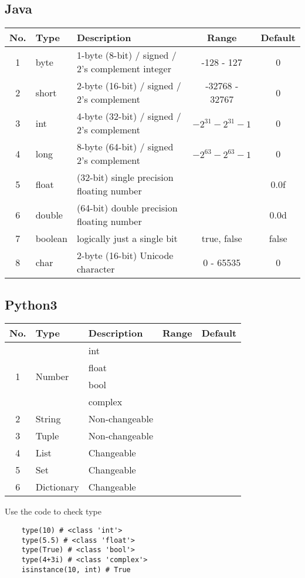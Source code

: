 \documentclass[12pt, a4pape]{article}
\begin{document}
	\subsection{Java}
	\begin{table}[H]
	\centering
	\begin{tabular}{c|l|l|c|c}
	\toprule
	No. & Type & Description & Range & Default \\
	\toprule
	1 & byte & 1-byte (8-bit) / signed / 2's complement integer & -128 - 127 & 0 \\
	\hline
	2 & short & 2-byte (16-bit) / signed / 2's complement & -32768 - 32767 & 0 \\
	\hline
	3 & int & 4-byte (32-bit) / signed / 2's complement & $-2^{31} - 2^{31}-1$ & 0 \\
	\hline
	4 & long & 8-byte (64-bit) / signed 2's complement & $-2^{63} - 2^{63}-1$ & 0 \\
	\hline
	5 & float & (32-bit) single precision floating number  & & 0.0f \\
	\hline
	6 & double & (64-bit) double precision floating number & & 0.0d \\
	\hline
	7 & boolean & logically just a single bit &  true, false & false \\
	\hline
	8 & char & 2-byte (16-bit) Unicode character & 0 - 65535  & 0 \\
	\bottomrule
	\end{tabular}
	\end{table}
	
	\subsection{Python3}
	\begin{table}[H]
	\centering
	\begin{tabular}{c|l|l|c|c}
	\toprule
	No. & Type & Description & Range & Default \\
	\hline
	\multirow{4}{*}{1} & \multirow{4}{*}{Number} & int & &  \\
	& & float & & \\
	& & bool &  &\\
	& & complex & & \\
	\hline
	2 & String & Non-changeable & & \\
	\hline
	3 & Tuple & Non-changeable & & \\
	\hline
	4 & List & Changeable & & \\
	\hline
	5 & Set & Changeable & & \\	
	\hline
	6 & Dictionary & Changeable & & \\
	\bottomrule
	\end{tabular}
	\end{table}
	Use the code to check type
	\begin{lstlisting}
	type(10) # <class 'int'>
	type(5.5) # <class 'float'>
	type(True) # <class 'bool'>
	type(4+3i) # <class 'complex'>
	isinstance(10, int) # True
	\end{lstlisting}
\end{document}

